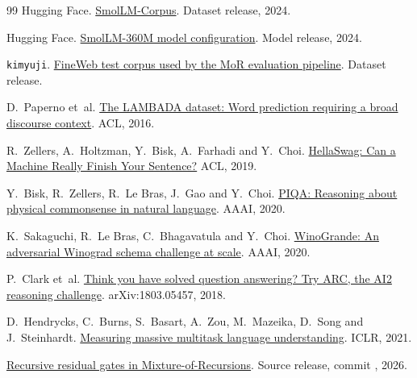 \documentclass[11pt,letterpaper]{article}
\newcommand{\code}[1]{\texttt{\detokenize{#1}}}
\begin{document}
\begin{thebibliography}{99}
Hugging Face. \href{https://huggingface.co/datasets/HuggingFaceTB/smollm-corpus}{SmolLM-Corpus}. Dataset release, 2024.

Hugging Face. \href{https://huggingface.co/HuggingFaceTB/SmolLM-360M/blob/1182e7e/config.json}{SmolLM-360M model configuration}. Model release, 2024.

\texttt{kimyuji}. \href{https://huggingface.co/datasets/kimyuji/fineweb-test}{FineWeb test corpus used by the MoR evaluation pipeline}. Dataset release.

D.~Paperno et~al. \href{https://aclanthology.org/P16-1144/}{The LAMBADA dataset: Word prediction requiring a broad discourse context}. ACL, 2016.

R.~Zellers, A.~Holtzman, Y.~Bisk, A.~Farhadi and Y.~Choi. \href{https://aclanthology.org/P19-1472/}{HellaSwag: Can a Machine Really Finish Your Sentence?} ACL, 2019.

Y.~Bisk, R.~Zellers, R.~Le Bras, J.~Gao and Y.~Choi. \href{https://arxiv.org/abs/1911.11641}{PIQA: Reasoning about physical commonsense in natural language}. AAAI, 2020.

K.~Sakaguchi, R.~Le Bras, C.~Bhagavatula and Y.~Choi. \href{https://arxiv.org/abs/1907.10641}{WinoGrande: An adversarial Winograd schema challenge at scale}. AAAI, 2020.

P.~Clark et~al. \href{https://arxiv.org/abs/1803.05457}{Think you have solved question answering? Try ARC, the AI2 reasoning challenge}. arXiv:1803.05457, 2018.

D.~Hendrycks, C.~Burns, S.~Basart, A.~Zou, M.~Mazeika, D.~Song and J.~Steinhardt. \href{https://arxiv.org/abs/2009.03300}{Measuring massive multitask language understanding}. ICLR, 2021.

\href{https://github.com/fangyihao/mor-residual-gates/tree/39f89193fb049fd5eda8c0a4cb930f7f4d087909}{Recursive residual gates in Mixture-of-Recursions}. Source release, commit \code{39f8919}, 2026.
\end{thebibliography}
\end{document}
